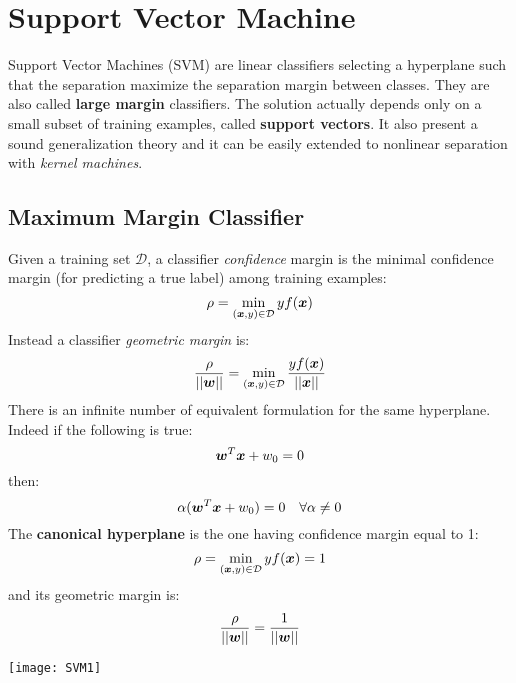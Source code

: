 \chapter{Support Vector Machine}
Support Vector Machines (SVM) are linear classifiers selecting a hyperplane such that the separation maximize the separation margin between classes. They are also called \textbf{large margin} classifiers.\newline
The solution actually depends only on a small subset of training examples, called \textbf{support vectors}. \newline
It also present a sound generalization theory and it can be easily extended to nonlinear separation with \textit{kernel machines}.
%
%
%
\section{Maximum Margin Classifier}
Given a training set $\mathcal{D}$, a classifier \textit{confidence} margin is the minimal confidence margin (for predicting a true label) among training examples:
\[\rho=\min\limits_{(\bm{x},y)\in\mathcal{D}}yf(\bm{x})\]
Instead a classifier \textit{geometric margin} is:
\[\frac{\rho}{\vert\vert\bm{w}\vert\vert}=\min\limits_{(\bm{x},y)\in\mathcal{D}}\frac{yf(\bm{x})}{\vert\vert\bm{x}\vert\vert}\]
There is an infinite number of equivalent formulation for the same hyperplane. Indeed if the following is true:
\[\bm{w}^T\bm{x}+w_0=0\]
then:
\[\alpha(\bm{w}^T\bm{x}+w_0)=0\quad\forall\alpha\neq 0\]
The \textbf{canonical hyperplane} is the one having confidence margin equal to 1:
\[\rho=\min\limits_{(\bm{x},y)\in\mathcal{D}}yf(\bm{x})=1\]
and its geometric margin is:
\[\frac{\rho}{\vert\vert\bm{w}\vert\vert}=\frac{1}{\vert\vert\bm{w}\vert\vert}\]
\begin{center}
  \texttt{[image: SVM1]}
\end{center}
%
%
%
